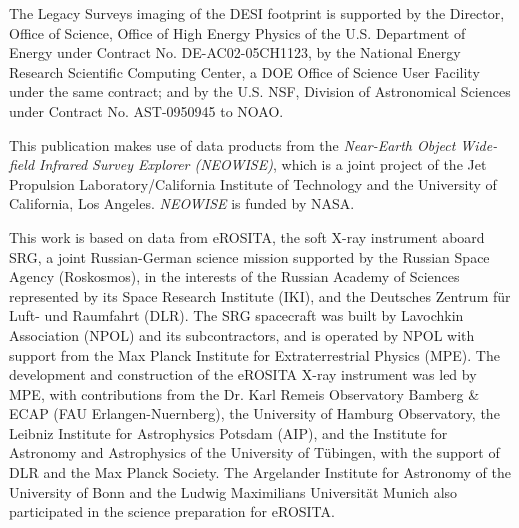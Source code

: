 \documentclass[twocolumn,twocolappendix, linenumbers, trackchanges]{aastex7}
\begin{document}
The Legacy Surveys imaging of the DESI footprint is supported by the Director, Office of Science, Office of High Energy Physics of the U.S. Department of Energy under Contract No. DE-AC02-05CH1123, by the National Energy Research Scientific Computing Center, a DOE Office of Science User Facility under the same contract; and by the U.S. NSF, Division of Astronomical Sciences under Contract No. AST-0950945 to NOAO.

This publication makes use of data products from the {\it Near-Earth Object Wide-field Infrared Survey Explorer (NEOWISE)}, which is a joint project of the Jet Propulsion Laboratory/California Institute of Technology and the University of California, Los Angeles. {\it NEOWISE} is funded by NASA.

This work is based on data from eROSITA, the soft X-ray instrument aboard SRG, a joint Russian-German science mission supported by the Russian Space Agency (Roskosmos), in the interests of the Russian Academy of Sciences represented by its Space Research Institute (IKI), and the Deutsches Zentrum für Luft- und Raumfahrt (DLR). The SRG spacecraft was built by Lavochkin Association (NPOL) and its subcontractors, and is operated by NPOL with support from the Max Planck Institute for Extraterrestrial Physics (MPE). The development and construction of the eROSITA X-ray instrument was led by MPE, with contributions from the Dr. Karl Remeis Observatory Bamberg \& ECAP (FAU Erlangen-Nuernberg), the University of Hamburg Observatory, the Leibniz Institute for Astrophysics Potsdam (AIP), and the Institute for Astronomy and Astrophysics of the University of Tübingen, with the support of DLR and the Max Planck Society. The Argelander Institute for Astronomy of the University of Bonn and the Ludwig Maximilians Universität Munich also participated in the science preparation for eROSITA.





\end{document}
